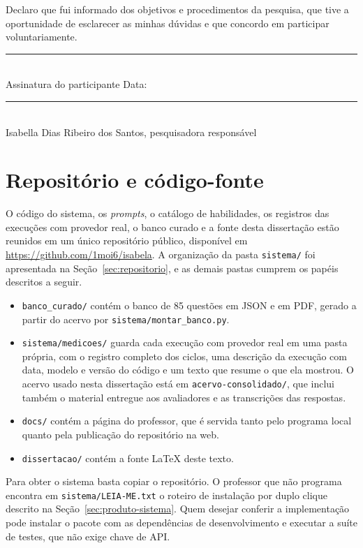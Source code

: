 Declaro que fui informado dos objetivos e procedimentos da pesquisa, que tive a oportunidade de
esclarecer as minhas dúvidas e que concordo em participar voluntariamente.

\vspace{1.5cm}
\noindent\rule{8cm}{0.4pt}\\
Assinatura do participante \hfill Data: \underline{\hspace{3cm}}

\vspace{1cm}
\noindent\rule{8cm}{0.4pt}\\
Isabella Dias Ribeiro dos Santos, pesquisadora responsável

\chapter{Repositório e código-fonte}
\label{ap:repositorio}

O código do sistema, os \emph{prompts}, o catálogo de habilidades, os registros das execuções com
provedor real, o banco curado e a fonte desta dissertação estão reunidos em um único repositório
público, disponível em \url{https://github.com/1moi6/isabela}. A organização da pasta
\texttt{sistema/} foi apresentada na Seção~\ref{sec:repositorio}, e as demais pastas cumprem os
papéis descritos a seguir.

\begin{itemize}
\item \texttt{banco\_curado/} contém o banco de 85 questões em JSON e em PDF, gerado a partir do
  acervo por \texttt{sistema/montar\_banco.py}.
\item \texttt{sistema/medicoes/} guarda cada execução com provedor real em uma pasta própria, com o
  registro completo dos ciclos, uma descrição da execução com data, modelo e versão do código e um
  texto que resume o que ela mostrou. O acervo usado nesta dissertação está em
  \texttt{acervo-consolidado/}, que inclui também o material entregue aos avaliadores e as
  transcrições das respostas.
\item \texttt{docs/} contém a página do professor, que é servida tanto pelo programa local quanto
  pela publicação do repositório na web.
\item \texttt{dissertacao/} contém a fonte \LaTeX{} deste texto.
\end{itemize}

Para obter o sistema basta copiar o repositório. O professor que não programa encontra em
\texttt{sistema/LEIA-ME.txt} o roteiro de instalação por duplo clique descrito na
Seção~\ref{sec:produto-sistema}. Quem desejar conferir a implementação pode instalar o pacote com
as dependências de desenvolvimento e executar a suíte de testes, que não exige chave de API.

